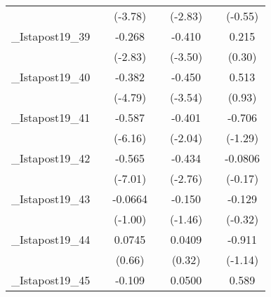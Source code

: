 {\begin{tabular}{l*{6}{c}}
            &                     &     (-3.78)         &                     &     (-2.83)         &                     &     (-0.55)         \\
[1em]
\_Istapost19\_39&                     &      -0.268\sym{**} &                     &      -0.410\sym{**} &                     &       0.215         \\
            &                     &     (-2.83)         &                     &     (-3.50)         &                     &      (0.30)         \\
[1em]
\_Istapost19\_40&                     &      -0.382\sym{***}&                     &      -0.450\sym{**} &                     &       0.513         \\
            &                     &     (-4.79)         &                     &     (-3.54)         &                     &      (0.93)         \\
[1em]
\_Istapost19\_41&                     &      -0.587\sym{***}&                     &      -0.401         &                     &      -0.706         \\
            &                     &     (-6.16)         &                     &     (-2.04)         &                     &     (-1.29)         \\
[1em]
\_Istapost19\_42&                     &      -0.565\sym{***}&                     &      -0.434\sym{**} &                     &     -0.0806         \\
            &                     &     (-7.01)         &                     &     (-2.76)         &                     &     (-0.17)         \\
[1em]
\_Istapost19\_43&                     &     -0.0664         &                     &      -0.150         &                     &      -0.129         \\
            &                     &     (-1.00)         &                     &     (-1.46)         &                     &     (-0.32)         \\
[1em]
\_Istapost19\_44&                     &      0.0745         &                     &      0.0409         &                     &      -0.911         \\
            &                     &      (0.66)         &                     &      (0.32)         &                     &     (-1.14)         \\
[1em]
\_Istapost19\_45&                     &      -0.109         &                     &      0.0500         &                     &       0.589         \\

\end{tabular}}
